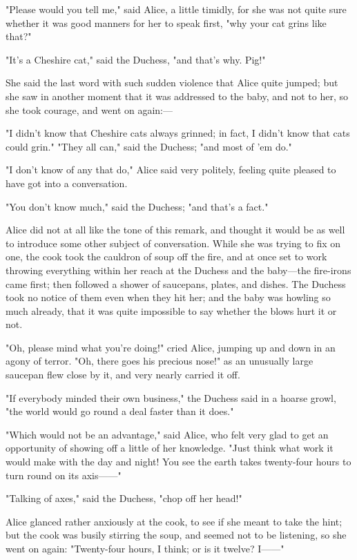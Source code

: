 "Please would you tell me," said Alice, a little timidly, for she was not quite sure whether it was good manners for her to speak first, "why your cat grins like that?"

"It's a Cheshire cat," said the Duchess, "and that's why. Pig!"

She said the last word with such sudden violence that Alice quite jumped; but she saw in another moment that it was addressed to the baby, and not to her, so she took courage, and went on again:—

"I didn't know that Cheshire cats always grinned; in fact, I didn't know that cats could grin." ​"They all can," said the Duchess; "and most of 'em do."

"I don't know of any that do," Alice said very politely, feeling quite pleased to have got into a conversation.

"You don't know much," said the Duchess; "and that's a fact."

Alice did not at all like the tone of this remark, and thought it would be as well to introduce some other subject of conversation. While she was trying to fix on one, the cook took the cauldron of soup off the fire, and at once set to work throwing everything within her reach at the Duchess and the baby—the fire-irons came first; then followed a shower of saucepans, plates, and dishes. The Duchess took no notice of them even when they hit her; and the baby was howling so much already, that it was quite impossible to say whether the blows hurt it or not.

"Oh, please mind what you're doing!" cried Alice, jumping up and down in an agony of ​terror. "Oh, there goes his precious nose!" as an unusually large saucepan flew close by it, and very nearly carried it off.

"If everybody minded their own business," the Duchess said in a hoarse growl, "the world would go round a deal faster than it does."

"Which would not be an advantage," said Alice, who felt very glad to get an opportunity of showing off a little of her knowledge. "Just think what work it would make with the day and night! You see the earth takes twenty-four hours to turn round on its axis——"

"Talking of axes," said the Duchess, "chop off her head!"

Alice glanced rather anxiously at the cook, to see if she meant to take the hint; but the cook was busily stirring the soup, and seemed not to be listening, so she went on again: "Twenty-four hours, I think; or is it twelve? I——"

